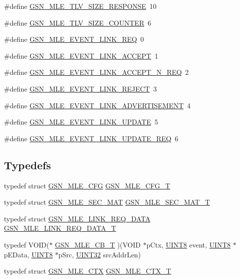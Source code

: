 \begin{DoxyCompactItemize}
\item 
\#define \hyperlink{a00527_a5aaa62eed46095f65360512e198ce6b6}{GSN\_\-MLE\_\-TLV\_\-SIZE\_\-RESPONSE}~10
\item 
\#define \hyperlink{a00527_aee3b5193bb4624951bb8bde1d0ab10f2}{GSN\_\-MLE\_\-TLV\_\-SIZE\_\-COUNTER}~6
\item 
\#define \hyperlink{a00527_a9d781976c514d4c27e18eba2bc5040c2}{GSN\_\-MLE\_\-EVENT\_\-LINK\_\-REQ}~0
\item 
\#define \hyperlink{a00527_a011ae7add0b9495af647fd4d8f2037c2}{GSN\_\-MLE\_\-EVENT\_\-LINK\_\-ACCEPT}~1
\item 
\#define \hyperlink{a00527_ad5e93bb6883ed682c1cc71c4153b308d}{GSN\_\-MLE\_\-EVENT\_\-LINK\_\-ACCEPT\_\-N\_\-REQ}~2
\item 
\#define \hyperlink{a00527_ab2c87c6f321a9873218ecbacc65b0dce}{GSN\_\-MLE\_\-EVENT\_\-LINK\_\-REJECT}~3
\item 
\#define \hyperlink{a00527_a0d81797b692d547670462ce3cff36aea}{GSN\_\-MLE\_\-EVENT\_\-LINK\_\-ADVERTISEMENT}~4
\item 
\#define \hyperlink{a00527_a6be437a6195684fe311501b5222d2de5}{GSN\_\-MLE\_\-EVENT\_\-LINK\_\-UPDATE}~5
\item 
\#define \hyperlink{a00527_aa738d58de196cd03657a3193efc846b7}{GSN\_\-MLE\_\-EVENT\_\-LINK\_\-UPDATE\_\-REQ}~6
\end{DoxyCompactItemize}
\subsection*{Typedefs}
\begin{DoxyCompactItemize}
\item 
typedef struct \hyperlink{a00150}{GSN\_\-MLE\_\-CFG} \hyperlink{a00527_a7d33a4e5e3f74734f27df81430a43535}{GSN\_\-MLE\_\-CFG\_\-T}
\item 
typedef struct \hyperlink{a00153}{GSN\_\-MLE\_\-SEC\_\-MAT} \hyperlink{a00527_a02cb6a04a0b957eb00dee76c2762b407}{GSN\_\-MLE\_\-SEC\_\-MAT\_\-T}
\item 
typedef struct \hyperlink{a00152}{GSN\_\-MLE\_\-LINK\_\-REQ\_\-DATA} \hyperlink{a00527_a26296abd5a01a53cb32594e305e1fd5f}{GSN\_\-MLE\_\-LINK\_\-REQ\_\-DATA\_\-T}
\item 
typedef VOID($\ast$ \hyperlink{a00527_ab913f34ba94e3fffc3ebcc67f2df5c3e}{GSN\_\-MLE\_\-CB\_\-T} )(VOID $\ast$pCtx, \hyperlink{a00660_gab27e9918b538ce9d8ca692479b375b6a}{UINT8} event, \hyperlink{a00660_gab27e9918b538ce9d8ca692479b375b6a}{UINT8} $\ast$pEData, \hyperlink{a00660_gab27e9918b538ce9d8ca692479b375b6a}{UINT8} $\ast$pSrc, \hyperlink{a00660_gae1e6edbbc26d6fbc71a90190d0266018}{UINT32} srcAddrLen)
\item 
typedef struct \hyperlink{a00151}{GSN\_\-MLE\_\-CTX} \hyperlink{a00527_a592894f5841d4b4e6fe61fa65893b951}{GSN\_\-MLE\_\-CTX\_\-T}
\end{DoxyCompactItemize}

